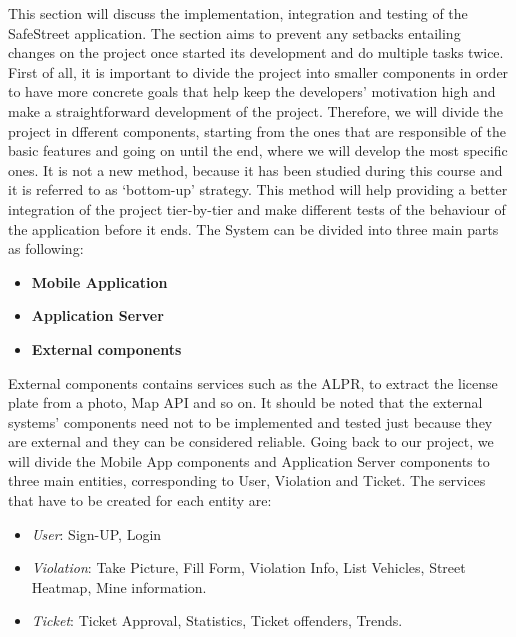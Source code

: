 This section will discuss the implementation, integration and testing of the SafeStreet application. The section aims to prevent any setbacks entailing changes on the project once started its development and do multiple tasks twice. First of all, it is important to divide the project into smaller components in order to have more concrete goals that help keep the developers’ motivation high and make a straightforward development of the project. Therefore, we will divide the project in dfferent components, starting from the ones that are responsible of the basic features and going on until the end, where we will develop the most speciﬁc ones. It is not a new method, because it has been studied during this course and it is referred to as ‘bottom-up’ strategy. This method will help providing a better integration of the project tier-by-tier and make different tests of the behaviour of the application before it ends. The System can be divided into three main parts as following:\\

\begin{itemize}
    \item \textbf{Mobile Application}
    \item \textbf{Application Server}
    \item \textbf{External components}
\end{itemize}
External components contains services such as the ALPR, to extract the license plate from a photo, Map API and so on. It should be noted that the external systems’ components need not to be implemented and tested just because they are external and they can be considered reliable.
Going back to our project, we will divide the Mobile App components and Application Server components to three main entities, corresponding to User, Violation and Ticket.
The services that have to be created for each entity are:
\begin{itemize}
\item{} \textit{User}: Sign-UP, Login
\item{} \textit{Violation}: Take Picture, Fill Form, Violation Info, List Vehicles, Street Heatmap, Mine information.
\item{} \textit{Ticket}: Ticket Approval, Statistics, Ticket offenders, Trends.
\end{itemize}

